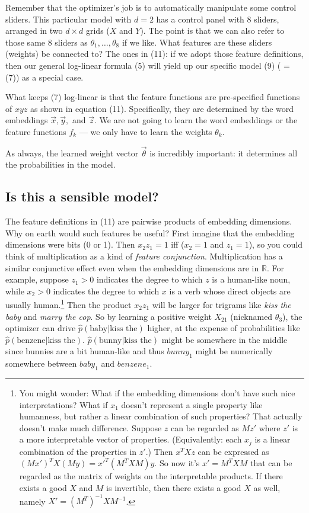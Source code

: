 \documentclass[12pt]{article}
\theoremstyle{plain}
\theoremstyle{definition}
\theoremstyle{remark}
\begin{document}
Remember that the optimizer’s job is to automatically manipulate some control sliders. This particular model with $d=2$ has a control panel with 8 sliders, arranged in two $d \times d$ grids ($X$ and $Y$). The point is that we can also refer to those same 8 sliders as $\theta_1,\ldots,\theta_8$ if we like. What features are these sliders (weights) be connected to? The ones in (11): if we adopt those feature definitions, then our general log-linear formula (5) will yield up our specific model (9) ( = (7)) as a special case. 

What keeps (7) log-linear is that the feature functions are pre-specified functions of $xyz$ as shown in equation (11). Specifically, they are determined by the word embeddings $\vec{x}, \vec{y},$ and $\vec{z}$. We are not going to learn the word embeddings or the feature functions $f_k$ — we only have to learn the weights $\theta_k$.  

As always, the learned weight vector $\vec{\theta}$ is incredibly important: it determines all the probabilities in the model.  

\subsection*{Is this a sensible model?}
The feature definitions in (11) are pairwise products of embedding dimensions. Why on earth would such features be useful? First imagine that the embedding dimensions were bits (0 or 1). Then $x_2z_1=1$ iff ($x_2=1$ and $z_1=1$), so you could think of multiplication as a kind of \textit{feature conjunction}. Multiplication has a similar conjunctive effect even when the embedding dimensions are in $\mathbb{R}$. For example, suppose $z_1>0$ indicates the degree to which $z$ is a human-like noun, while $x_2>0$ indicates the degree to which $x$ is a verb whose direct objects are usually human.\footnote{You might wonder: What if the embedding dimensions don’t have such nice interpretations? What if $x_1$ doesn’t represent a single property like humanness, but rather a linear combination of such properties? That actually doesn’t make much difference. Suppose $z$ can be regarded as $Mz'$ where $z'$ is a more interpretable vector of properties. (Equivalently: each $x_j$ is a linear combination of the properties in $z'$.) Then $x^T X z$ can be expressed as $(Mx')^T X (My) = x'^T (M^T X M) y$. So now it’s $x' = M^T X M$ that can be regarded as the matrix of weights on the interpretable products. If there exists a good $X$ and $M$ is invertible, then there exists a good $X$ as well, namely $X' = (M^T)^{-1} X M^{-1}$.} Then the product $x_2 z_1$ will be larger for trigrams like \textit{kiss the baby} and \textit{marry the cop}. So by learning a positive weight $X_{21}$ (nicknamed $\theta_3$), the optimizer can drive $\hat{p}(\text{baby}|\text{kiss the})$ higher, at the expense of probabilities like $\hat{p}(\text{benzene}|\text{kiss the})$. $\hat{p}(\text{bunny}|\text{kiss the})$ might be somewhere in the middle since bunnies are a bit human-like and thus $bunny_1$ might be numerically somewhere between $baby_1$ and $benzene_1$.
\end{document}
